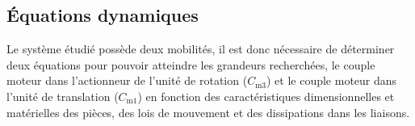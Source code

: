 \subsection{Équations dynamiques}

\ifprof
\else
Le système étudié possède deux mobilités, il est donc nécessaire de déterminer deux équations pour
pouvoir atteindre les grandeurs recherchées, le couple moteur dans l’actionneur de l’unité de rotation
($C_{\text{m3}}$) et le couple moteur dans l’unité de translation ($C_{\text{m1}}$) en fonction des caractéristiques
dimensionnelles et matérielles des pièces, des lois de mouvement et des dissipations dans les liaisons.
\fi


\ifprof
